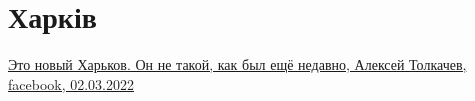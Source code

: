  
 
 
 
 
\section{Харків}

\hyperlink{02_03_2022.fb.tolkachev_aleksej.1.novyj_harkov}{
Это новый Харьков. Он не такой, как был ещё недавно, Алексей Толкачев, facebook, 02.03.2022%
}
